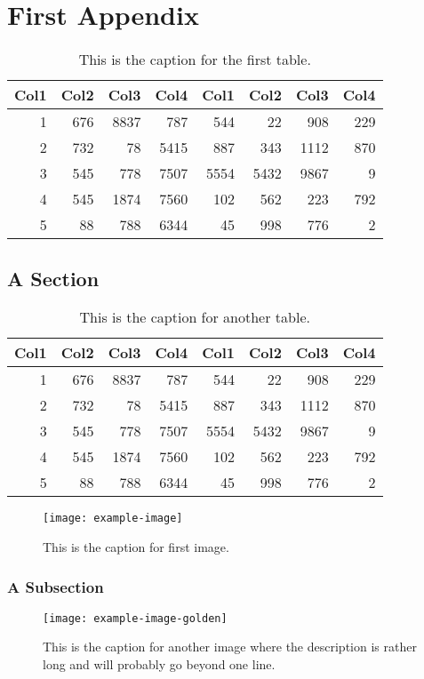 \chapter{First Appendix}
\lipsum[1]
\begin{table}
	\centering
	\begin{tabular}{r r r r r r r r}
		Col1 & Col2 & Col3 & Col4 & Col1 & Col2 & Col3 & Col4 \\
		\hline
		1    & 676  & 8837 & 787  & 544  & 22   & 908  & 229  \\
		2    & 732  & 78   & 5415 & 887  & 343  & 1112 & 870  \\
		3    & 545  & 778  & 7507 & 5554 & 5432 & 9867 & 9    \\
		4    & 545  & 1874 & 7560 & 102  & 562  & 223  & 792  \\
		5    & 88   & 788  & 6344 & 45   & 998  & 776  & 2    \\
		\hline
	\end{tabular}
	\caption{This is the caption for the first table.}
\end{table}
\lipsum[2]

\section{A Section}
\lipsum[3]
\begin{table}
	\centering
	\begin{tabular}{r r r r r r r r}
		Col1 & Col2 & Col3 & Col4 & Col1 & Col2 & Col3 & Col4 \\
		\hline
		1    & 676  & 8837 & 787  & 544  & 22   & 908  & 229  \\
		2    & 732  & 78   & 5415 & 887  & 343  & 1112 & 870  \\
		3    & 545  & 778  & 7507 & 5554 & 5432 & 9867 & 9    \\
		4    & 545  & 1874 & 7560 & 102  & 562  & 223  & 792  \\
		5    & 88   & 788  & 6344 & 45   & 998  & 776  & 2    \\
		\hline
	\end{tabular}
	\caption{This is the caption for another table.}
\end{table}
\lipsum[4-5]
\begin{figure}
	\centering
	\texttt{[image: example-image]}
	\caption{This is the caption for first image.}
\end{figure}

\subsection{A Subsection}
\lipsum[6-8]
\begin{figure}
	\centering
	\texttt{[image: example-image-golden]}
	\caption{This is the caption for another image where the description is rather long and will probably go beyond one line.}
\end{figure}

